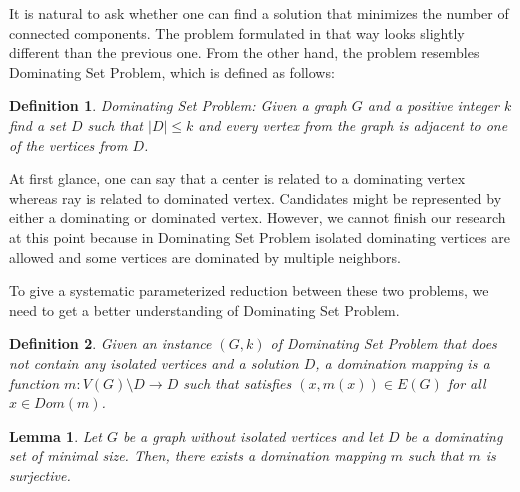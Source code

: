 \documentclass[en]{pracamgr}
\newtheorem{definition}{Definition}
\newtheorem{lemma}{Lemma}
\newcommand{\domsetp}{{\sc Dominating Set Problem}}
\begin{document}
It is natural to ask whether one can find a solution that minimizes the number of connected components. The problem formulated in that way looks slightly different than the previous one. From the other hand, the problem resembles \domsetp{}, which is defined as follows:

\begin{definition}
	\domsetp: Given a graph $G$ and a positive integer $k$ find a set $D$ such that $|D| \leq k$ and every vertex from the graph is adjacent to one of the vertices from $D$.
\end{definition}

At first glance, one can say that a center is related to a dominating vertex whereas ray is related to dominated vertex. Candidates might be represented by either a dominating or dominated vertex. However, we cannot finish our research at this point because in \domsetp{} isolated dominating vertices are allowed and some vertices are dominated by multiple neighbors. 

To give a systematic parameterized reduction between these two problems, we need to get a better understanding of \domsetp{}.

\begin{definition}
	Given an instance $(G,k)$ of Dominating Set Problem that does not contain any isolated vertices and a solution $D$, a {\normalfont domination mapping} is a function $m:V(G) \setminus D \rightarrow D$ such that satisfies $(x,m(x)) \in E(G)$ for all $x \in Dom(m)$.
\end{definition}

\begin{lemma}\label{dom mapping}
	Let $G$ be a graph without isolated vertices and let $D$ be a dominating set of minimal size. Then, there exists a domination mapping $m$ such that $m$ is surjective.
\end{lemma}
\end{document}
